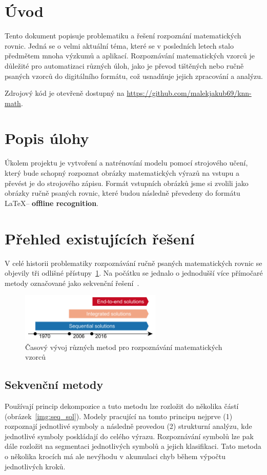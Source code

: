 \section{Úvod}
Tento dokument popisuje problematiku a řešení rozpoznání matematických rovnic. Jedná se o velmi aktuální téma, které se v posledních letech stalo předmětem mnoha výzkumů a aplikací. Rozpoznávání matematických vzorců je důležité pro automatizaci různých úloh, jako je převod tištěných nebo ručně psaných vzorců do digitálního formátu, což usnadňuje jejich zpracování a analýzu.

Zdrojový kód je otevřeně dostupný na \href{https://github.com/malekjakub69/knn-math}{https://github.com/malekjakub69/knn-math}.

\section{Popis úlohy}
Úkolem projektu je vytvoření a natrénování modelu pomocí strojového učení, který bude schopný rozpoznat obrázky matematických výrazů na vstupu a převést je do strojového zápisu. Formát vstupních obrázků jsme si zvolili jako obrázky ručně psaných rovnic, které budou následně převedeny do formátu \LaTeX -- \textbf{offline recognition}.


\section{Přehled existujících řešení}
V celé historii problematiky rozpoznávání ručně psaných matematických rovnic se objevily tři odlišné přístupy~\ref{img:method_history}. Na počátku se jednalo o jednodušší více přímočaré metody označované jako sekvenční řešení~\cite{ukr_survey}.

\begin{figure}[H]
    \centering
    \includegraphics[width=0.6\textwidth]{img/method_history.png}
    \caption{Časový vývoj různých metod pro rozpoznávání matematických vzorců}
    \label{img:method_history}
\end{figure}

\subsection{Sekvenční metody}
Používají princip dekompozice a tuto metodu lze rozložit do několika částí (obrázek~\ref{img:seq_sol}). Modely pracující na tomto principu nejprve (1) rozpoznají jednotlivé symboly a následně provedou (2) strukturní analýzu, kde jednotlivé symboly poskládají do celého výrazu. Rozpoznávání symbolů lze pak dále rozložit na segmentaci jednotlivých symbolů a jejich klasifikaci. Tato metoda o několika krocích má ale nevýhodu v akumulaci chyb během výpočtu jednotlivých kroků.

